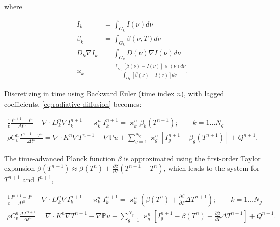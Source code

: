 \documentclass{template}
\begin{document}
where

\begin{subequations}
    \begin{align}
    I_k &= \int_{G_k} I(\nu) d\nu\\
    \beta_k &= \int_{G_k} \beta(\nu, T) d\nu\\
    D_k\nabla I_k &= \int_{G_k}D(\nu)\nabla I(\nu)d \nu\\
    \varkappa_k &= \frac{\int_{G_k} \left[\beta(\nu) - I(\nu) \right]   \varkappa(\nu) d\nu}{\int_{G_k} \left[\beta(\nu) - I(\nu) \right] d\nu}.
\end{align}
\end{subequations}

Discretizing in time using Backward Euler (time index $n$), with lagged coefficients, \autoref{eq:radiative-diffusion} becomes:

\begin{subequations}
    \begin{gather}
    \frac{1}{c}\frac{I^{n+1} - I^n}{\Delta t^n} - \nabla \cdot D_k^n \nabla I_k^{n+1} + \varkappa_k^n I_k^{n+1} = \varkappa_k^n \beta_k\left(T^{n+1}\right); \qquad k=1\dots N_g\\
    \rho C_v^n \frac{T^{n+1} - T^n}{\Delta t^n} = \nabla \cdot K^n \nabla T^{n+1} - \nabla {\mathbb{P}u} +  \sum_{g=1}^{N_g} \varkappa_g^n \left[ I_g^{n+1} - \beta_g(T^{n+1}) \right] + Q^{n+1}.
\end{gather}
\end{subequations}


The time-advanced Planck function $\beta$ is approximated using the first-order Taylor expansion $\beta(T^{n+1}) \approx \beta(T^n) + \frac{\partial \beta}{\partial T} (T^{n+1} - T^n)$, which leads to the system for $T^{n+1}$ and $I^{n+1}$,

\begin{subequations}
   \begin{gather}
    \frac{1}{c}\frac{I^{n+1} - I^n}{\Delta t^n} - \nabla \cdot D_k^n \nabla I_k^{n+1} + \varkappa_k^n I_k^{n+1} = \varkappa_k^n  \left(\beta(T^n) + \frac{\partial\beta}{\partial T} \Delta T^{n+1} \right)    ; \qquad k=1\dots N_g\\
    \rho C_v^n \frac{\Delta T^{n+1}}{\Delta t^n} = \nabla \cdot K^n \nabla T^{n+1} - \nabla {\mathbb{P}u} +  \sum_{g=1}^{N_g} \varkappa_g^n \left[ I_g^{n+1} - \beta(T^n) - \frac{\partial\beta}{\partial T} \Delta T^{n+1} \right] + Q^{n+1}.
\end{gather}
\end{subequations}
\end{document}
